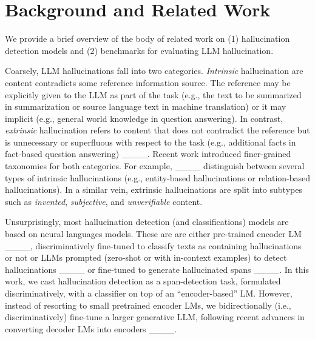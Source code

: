 \section{Background and Related Work}

We provide a brief overview of the body of related work on (1) hallucination detection models and (2) benchmarks for evaluating LLM hallucination. 


%
Coarsely, LLM hallucinations fall into two categories. \textit{Intrinsic} hallucination are content contradicts some reference information source. The reference may be explicitly given to the LLM as part of the task (e.g., the text to be summarized in summarization or source language text in machine translation) or it may implicit (e.g., general world knowledge in question answering). In contrast, \textit{extrinsic} hallucination refers to content that does not contradict the reference but is unnecessary or superfluous with respect to the task (e.g., additional facts in fact-based question answering) ____. Recent work introduced finer-grained taxonomies for both categories. For example, ____ distinguish between several types of intrinsic hallucinations (e.g., entity-based hallucinations or relation-based hallucinations). In a similar vein, extrinsic hallucinations are split into subtypes such as \textit{invented}, \textit{subjective}, and \textit{unverifiable} content. 

Unsurprisingly, most hallucination detection (and classifications) models are based on neural languages models. These are are either pre-trained encoder LM ____, discriminatively fine-tuned to classify texts as containing hallucinations or not or LLMs prompted (zero-shot or with in-context examples) to detect hallucinations ____ or fine-tuned to generate hallucinated spans ____. 
In this work, we cast hallucination detection as a span-detection task, formulated discriminatively, with a classifier on top of an ``encoder-based'' LM. However, instead of resorting to small pretrained encoder LMs, we bidirectionally (i.e., discriminatively) fine-tune a larger generative LLM, following recent advances in converting decoder LMs into encoders ____.     

